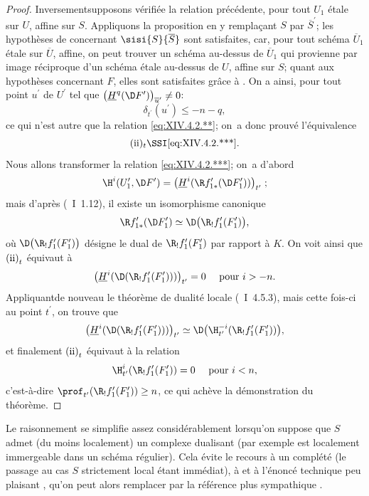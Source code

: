 \begin{proof}
Inversement\pageoriginale supposons v\'erifi\'ee la relation pr\'ec\'edente, pour tout $U_{1}$ \'etale sur $U$, affine sur $S$. Appliquons la proposition  en y rempla\c cant $S$ par $\overline{S}^{\prime}$; les hypoth\`eses de  concernant $\sisi{S}{\overline{S}}$ sont satisfaites, car, pour tout sch\'ema $\overline{U}_{1}$ \'etale sur $\overline{U}$, affine, on peut trouver un sch\'ema au-dessus de $\overline{U}_{1}$ qui provienne par image r\'eciproque d'un sch\'ema \'etale au-dessus de $U$, affine sur $S$; quant aux hypoth\`eses concernant $F$, elles sont satisfaites gr\^ace \`a . On a ainsi, pour tout point $u^{\prime}$ de $U^{\prime}$ tel que $\big(\underline{H}^{q}(\D F^{\prime})\big)_{\overline{u}^{\prime}}\neq 0$:
$$
\delta_{t^{\prime}}(u^{\prime})\leq -n-q,
$$
ce qui n'est autre que la relation \eqref{eq:XIV.4.2.**}; on~a donc prouv\'e l'\'equivalence
$$
\text{\textup{(ii)}$_{t}$\SSI\eqref{eq:XIV.4.2.***}}.
$$
Nous allons transformer la relation \eqref{eq:XIV.4.2.***}; on~a d'abord
$$
\H^{i}(U_{1}^{\prime}, \D F^{\prime})=\big(\underline{H}^{i}(\R f_{1\ast}^{\prime}(\D F_{1}^{\prime}))\big)_{t^{\prime}}\;;$$
mais d'apr\`es (~I~1.12), il existe un isomorphisme canonique
$$
\R f_{1\ast}^{\prime}(\D F_{1}^{\prime})\simeq\D\big(\R_{!}f_{1}^{\prime}(F_{1}^{\prime})\big),
$$
o\`u $\D\big(\R_{!}f_{1}^{\prime}(F_{1}^{\prime})\big)$ d\'esigne le dual de $\R_{!}f_{1}^{\prime}(F_{1}^{\prime})$ par rapport \`a $K$. On voit ainsi que $\textup{(ii)}_{t}$ \'equivaut \`a
$$
\big(\underline{H}^{i}(\D(\R_{!}f_{1}^{\prime}(F_{1}^{\prime})))\big)_{t^{\prime}}=0\quad\textrm{ pour }i>-n.
$$
Appliquant\pageoriginale de nouveau le th\'eor\`eme de dualit\'e locale (~I~4.5.3), mais cette fois-ci au point $t^{\prime}$, on trouve que
$$
\big(\underline{H}^{i}(\D(\R_{!}f_{1}^{\prime}(F_{1}^{\prime})))\big)_{t^{\prime}}\simeq\D\big(\H_{t^{\prime}}^{-i}(\R_{!}f_{1}^{\prime}(F_{1}^{\prime}))\big),
$$
et finalement $\textup{(ii)}_{t}$ \'equivaut \`a la relation
$$
\H_{t^{\prime}}^{i}(\R_{!}f_{1}^{\prime}(F_{1}^{\prime}))=0\quad\textrm{ pour }i<n,
$$
c'est-\`a-dire $\prof_{t^{\prime}}(\R_{!}f_{1}^{\prime}(F_{1}^{\prime}))\geq n$, ce qui ach\`eve la d\'emonstration du th\'eor\`eme.
\skipqed
\end{proof}

\begin{subremarque} \label{XIV.4.2.3}
Le raisonnement se simplifie assez consid\'erablement lorsqu'on suppose que $S$ admet (du moins localement) un complexe dualisant (par exemple est localement immergeable dans un sch\'ema r\'egulier). Cela \'evite le recours \`a un compl\'et\'e (le passage au cas $S$ strictement local \'etant imm\'ediat), \`a  et \`a l'\'enonc\'e technique peu plaisant , qu'on peut alors remplacer par la r\'ef\'erence plus sympathique .
\end{subremarque}

